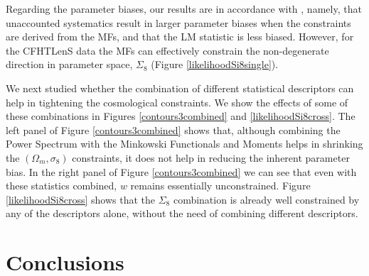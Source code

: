\documentclass[reprint,aps,prd,superscriptaddress,showkeys,showpacs]{revtex4-1}
\begin{document}

Regarding the parameter biases, our results are in accordance with  \citep{PetriSpurious}, namely, that unaccounted systematics result in larger parameter biases when the constraints are derived from the MFs, and that the LM statistic is less biased. However, for the CFHTLenS data the MFs can effectively constrain the non-degenerate direction in parameter space, $\Sigma_8$ (Figure \ref{likelihoodSi8single}). 



We next studied whether the combination of different statistical descriptors can help in tightening the cosmological constraints. We show the effects of some of these combinations in Figures \ref{contours3combined} and \ref{likelihoodSi8cross}. The left panel of Figure \ref{contours3combined} shows that, although combining the Power Spectrum with the Minkowski Functionals and Moments helps in shrinking the $(\Omega_m,\sigma_8)$ constraints, it does not help in reducing the inherent parameter bias. In the right panel of Figure \ref{contours3combined} we can see that even with these statistics combined, $w$ remains essentially unconstrained. Figure \ref{likelihoodSi8cross} shows that the $\Sigma_8$ combination is already well constrained by any of the descriptors alone, without the need of combining different descriptors.   


\section{Conclusions}
\end{document}
